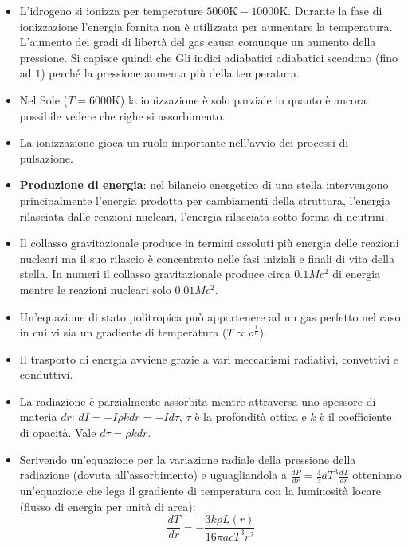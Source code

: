 \documentclass[11pt,a4paper]{article}
\begin{document}
\begin{itemize}
\item L'idrogeno si ionizza per temperature $5000 \si{\K}-10000 \si{\K}$. Durante la fase di ionizzazione l'energia fornita non è utilizzata per aumentare la temperatura. L'aumento dei gradi di libertà del gas causa comunque un aumento della pressione. Si capisce quindi che Gli indici adiabatici adiabatici scendono (fino ad $1$) perché la pressione aumenta più della temperatura.

\item Nel Sole ($T = 6000 \si{\K}$) la ionizzazione è solo parziale in quanto è ancora possibile vedere che righe si assorbimento.

\item La ionizzazione gioca un ruolo importante nell'avvio dei processi di pulsazione.

\item \textbf{Produzione di energia}: nel bilancio energetico di una stella intervengono principalmente l'energia prodotta per cambiamenti della struttura, l'energia rilasciata dalle reazioni nucleari, l'energia rilasciata sotto forma di neutrini.

\item Il collasso gravitazionale produce in termini assoluti più energia delle reazioni nucleari ma il suo rilascio è concentrato nelle fasi iniziali e finali di vita della stella. In numeri il collasso gravitazionale produce circa $0.1 Mc^2$ di energia mentre le reazioni nucleari solo $0.01 Mc^2$.

\item Un'equazione di stato politropica può appartenere ad un gas perfetto nel caso in cui vi sia un gradiente di temperatura ($T \propto \rho^{\frac{1}{n}}$).

\item Il trasporto di energia avviene grazie a vari meccanismi radiativi, convettivi e conduttivi.

\item La radiazione è parzialmente assorbita mentre attraversa uno spessore di materia $dr$: $dI = - I \rho k dr = - I d \tau$, $\tau$ è la profondità ottica e $k$ è il coefficiente di opacità. Vale $d \tau = \rho k dr$.  


\item Scrivendo un'equazione per la variazione radiale della pressione della radiazione (dovuta all'assorbimento) e uguagliandola a $\frac{d P}{d r} = \frac{4}{3} a T^3 \frac{dT}{dr}$ otteniamo un'equazione che lega il gradiente di temperatura con la luminosità locare (flusso di energia per unità di area):
\begin{equation}
\frac{dT}{dr} = - \frac{3 k \rho L(r) }{16 \pi a c T^3 r^2}
\end{equation} 


\end{itemize}
\end{document}
